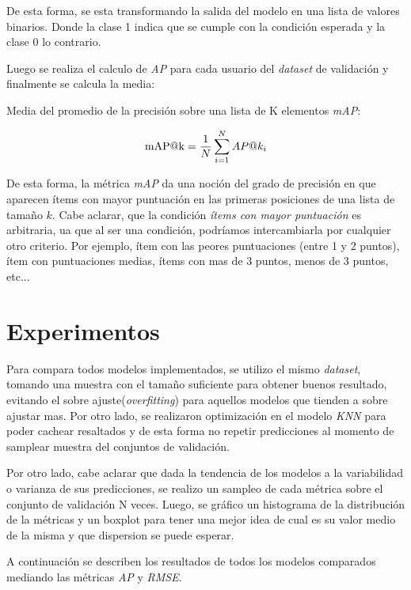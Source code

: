 \documentclass[11pt,a4paper,twoside]{thesis}
\begin{document}
De esta forma, se esta transformando la salida del modelo en una lista de
valores binarios. Donde la clase 1 indica que se cumple con la condición
esperada y la clase 0 lo contrario.

Luego se realiza el calculo de \textit{AP\makeatletter@k} para cada usuario del
\textit{dataset} de validación y finalmente se calcula la media:

\begin{description}
	\item[Media del promedio de la precisión sobre una lista de K elementos
	\textit{mAP\makeatletter@k}:]
\end{description}
\begin{equation}
	\operatorname{mAP\makeatletter@k}=\frac{1}{N} \sum_{i=1}^N AP\makeatletter@k_i
\end{equation}

De esta forma, la métrica \textit{mAP\makeatletter@k} da una noción del grado
de precisión en que aparecen ítems con mayor puntuación en las primeras
posiciones de una lista de tamaño $k$. Cabe aclarar, que la condición
\textit{ítems con mayor puntuación} es arbitraria, ua que al ser una condición,
podríamos intercambiarla por cualquier otro criterio. Por ejemplo, ítem con las
peores puntuaciones (entre 1 y 2 puntos), ítem con puntuaciones medias, ítems
con mas de 3 puntos, menos de 3 puntos, etc...

\chapter{Experimentos}

Para compara todos modelos implementados, se utilizo el mismo \textit{dataset},
tomando una muestra con el tamaño suficiente para obtener buenos resultado,
evitando el sobre ajuste(\textit{overfitting}) para aquellos modelos que
tienden a sobre ajustar mas. Por otro lado, se realizaron optimización en el
modelo \textit{KNN} para poder cachear resaltados y de esta forma no repetir
predicciones al momento de samplear muestra del conjuntos de validación.

Por otro lado, cabe aclarar que dada la tendencia de los modelos a la
variabilidad o varianza de sus predicciones, se realizo un sampleo de cada
métrica sobre el conjunto de validación N veces. Luego, se gráfico un
histograma de la distribución de la métricas y un boxplot para tener una mejor
idea de cual es su valor medio de la misma y que dispersion se puede esperar.

A continuación se describen los resultados de todos los modelos comparados
mediando las métricas \textit{AP\makeatletter@k} y \textit{RMSE}.
\end{document}
